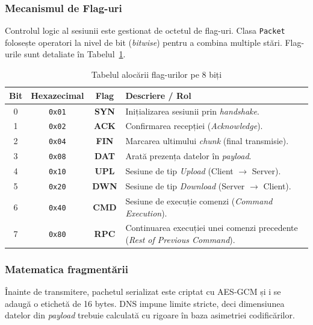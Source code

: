 \subsubsection{Mecanismul de Flag-uri}
Controlul logic al sesiunii este gestionat de octetul de flag-uri. Clasa \texttt{Packet} folosește operatori la nivel de bit (\textit{bitwise}) pentru a combina multiple stări. Flag-urile sunt detaliate în Tabelul~\ref{tab:flags_protocol}.

\begin{table}[htbp]
    \centering
    \small
    \renewcommand{\arraystretch}{1.1}
    \begin{tabular}{|c|c|c|>{\raggedright\arraybackslash}p{8.5cm}|}
        \hline
        \textbf{Bit} & \textbf{Hexazecimal} & \textbf{Flag} & \textbf{Descriere / Rol} \\
        \hline
        0 & \texttt{0x01} & \textbf{SYN} & Inițializarea sesiunii prin \textit{handshake}. \\
        \hline
        1 & \texttt{0x02} & \textbf{ACK} & Confirmarea recepției (\textit{Acknowledge}). \\
        \hline
        2 & \texttt{0x04} & \textbf{FIN} & Marcarea ultimului \textit{chunk} (final transmisie). \\
        \hline
        3 & \texttt{0x08} & \textbf{DAT} & Arată prezența datelor în \textit{payload}. \\
        \hline
        4 & \texttt{0x10} & \textbf{UPL} & Sesiune de tip \textit{Upload} (Client $\rightarrow$ Server). \\
        \hline
        5 & \texttt{0x20} & \textbf{DWN} & Sesiune de tip \textit{Download} (Server $\rightarrow$ Client). \\
        \hline
        6 & \texttt{0x40} & \textbf{CMD} & Sesiune de execuție comenzi (\textit{Command Execution}). \\
        \hline
        7 & \texttt{0x80} & \textbf{RPC} & Continuarea execuției unei comenzi precedente (\textit{Rest of Previous Command}). \\
        \hline
    \end{tabular}
    \caption{Tabelul alocării flag-urilor pe 8 biți}
    \label{tab:flags_protocol}
\end{table}

\subsubsection{Matematica fragmentării}
Înainte de transmitere, pachetul serializat este criptat cu AES-GCM și i se adaugă o etichetă de 16 bytes. DNS impune limite stricte, deci dimensiunea datelor din \textit{payload} trebuie calculată cu rigoare în baza asimetriei codificărilor.
